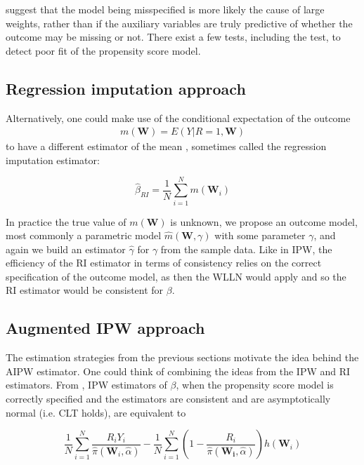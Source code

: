 \documentclass[12pt,twoside]{article}
\begin{document}
\citet{kang} suggest that the model being misspecified is more likely the cause of large weights, rather than if the auxiliary variables are truly predictive of whether the outcome may be missing or not. There exist a few tests, including the \citet{hosmer} test, to detect poor fit of the propensity score model.\\

\subsection{Regression imputation approach} 

Alternatively, one could make use of the conditional expectation of the outcome 
\begin{align*}
    m(\mathbf{W}) = E(Y|R= 1,\mathbf{W})
\end{align*}
to have a different estimator of the mean \citep{davidian,vansteelandt}, sometimes called the regression imputation estimator: 

\begin{equation}
    \hat{\beta}_ {RI} = \frac{1}{N}\sum_{i=1}^N m(\mathbf{W}_i)
\end{equation}

In practice the true value of $m(\mathbf{W})$ is unknown, we propose an outcome model, most commonly a parametric model $\hat m(\mathbf{W}, \gamma)$ with some parameter $\gamma$, and again we build an estimator $\hat{\gamma}$ for $\gamma$ from the sample data. Like in IPW, the efficiency of the RI estimator in terms of consistency relies on the correct specification of the outcome model, as then the WLLN would apply and so the RI estimator would be consistent for $\beta$. \\

\subsection{Augmented IPW approach} 

The estimation strategies from the previous sections motivate the idea behind the AIPW estimator. One could think of combining the ideas from the IPW and RI estimators. From \citet{davidian}, IPW estimators of $\beta$, when the propensity score model is correctly specified and the estimators are consistent and are asymptotically normal (i.e. CLT holds), are equivalent to 

\begin{equation}
    \frac{1}{N}\sum_{i=1}^{N}\frac{R_iY_i}{\hat\pi(\mathbf{W}_i, \hat{\alpha})} - \frac{1}{N}\sum_{i=1}^{N} \left(1 - \frac{R_i}{\hat\pi(\mathbf{W_i},\hat{\alpha})} \right) h(\mathbf{W}_i)
\end{equation}
\end{document}
